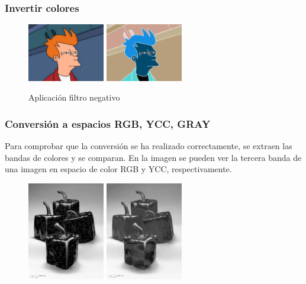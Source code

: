 \subsubsection{Invertir colores}
\vskip0.3cm
\begin{figure}[H]
 \centering
  \includegraphics[width=0.3\textwidth]{imagenes/Fry.jpg}
  \includegraphics[width=0.3\textwidth]{imagenes/fryNegativo.jpg}
 \caption{Aplicación filtro negativo}
 \label{diseño}
\end{figure}
\subsubsection{Conversión a espacios RGB, YCC, GRAY}
Para comprobar que la conversión se ha realizado correctamente, se extraen las bandas de colores y se comparan. En la imagen se pueden ver la tercera banda de una imagen en espacio de color RGB y YCC, respectivamente.
\vskip0.3cm
\begin{figure}[H]
 \centering
  \includegraphics[width=0.3\textwidth]{imagenes/banda3RGB.jpg}
  \includegraphics[width=0.3\textwidth]{imagenes/banda3YCC.jpg}
 \caption{}
 \label{diseño}
\end{figure}
